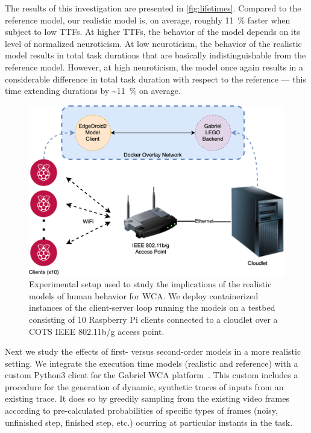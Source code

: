 The results of this investigation are presented in \cref{fig:lifetimes}.
Compared to the reference model, our realistic model is, on average, roughly \SI{11}{\percent} faster when subject to low \glspl{TTF}.
At higher \glspl{TTF}, the behavior of the model depends on its level of normalized neuroticism.
At low neuroticism, the behavior of the realistic model results in total task durations that are basically indistinguishable from the reference model.
However, at high neuroticism, the model once again results in a considerable difference in total task duration with respect to the reference --- this time extending durations by \textasciitilde\SI{11}{\percent} on average.

\begin{figure}
    \centering
    \includegraphics[width=.9\textwidth]{figs/EdgeDroid2ExperimentalSetup}
    \caption{%
        Experimental setup used to study the implications of the realistic models of human behavior for \gls{WCA}.
        We deploy containerized instances of the client-server loop running the models on a testbed consisting of \num{10} Raspberry Pi clients connected to a cloudlet over a \gls{COTS} \gls{IEEE} \num{802.11}b/g access point.
    }\label{fig:expsetup}
\end{figure}

Next we study the effects of first- versus second-order models in a more realistic setting.
We integrate the execution time models (realistic and reference) with a custom Python3 client for the Gabriel \gls{WCA} platform~\cite{chen2018application}.
This custom includes a procedure for the generation of dynamic, synthetic traces of inputs from an existing trace.
It does so by greedily sampling from the existing video frames according to pre-calculated probabilities of specific types of frames (noisy, unfinished step, finished step, etc.) ocurring at particular instants in the task.

